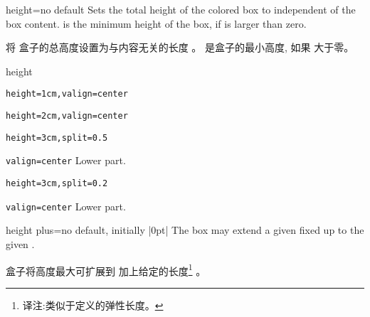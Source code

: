 \begin{docTcbKey}{height}{=}{no default}
Sets the total height of the colored box to  independent
of the box content.  is the minimum height of the box, if
 is larger than zero.

将%
盒子的总高度设置为与内容无关的长度  。  是盒子的最小高度, 如果
 大于零。
\begin{exdispExample}{height}

\begin{tcolorbox}[height=1cm,valign=center]
\verb|height=1cm,valign=center|
\end{tcolorbox}
\begin{tcolorbox}[height=2cm,valign=center]
\verb|height=2cm,valign=center|
\end{tcolorbox}

\begin{tcolorbox}[height=3cm,split=0.5,valign=center]
\verb|height=3cm,split=0.5|

\verb|valign=center|
\tcblower
Lower part.
\end{tcolorbox}
\begin{tcolorbox}[height=3cm,split=0.2,valign=center]
\verb|height=3cm,split=0.2|

\verb|valign=center|
\tcblower
Lower part.
\end{tcolorbox}
\end{exdispExample}

\end{docTcbKey}



\begin{docTcbKey}{height plus}{=}{no default, initially |0pt|}
The box may extend a given fixed  up to the given .

盒子将高度最大可扩展到  加上给定的长度\footnote{译注:类似于定义的弹性长度。} 。

\end{docTcbKey}


